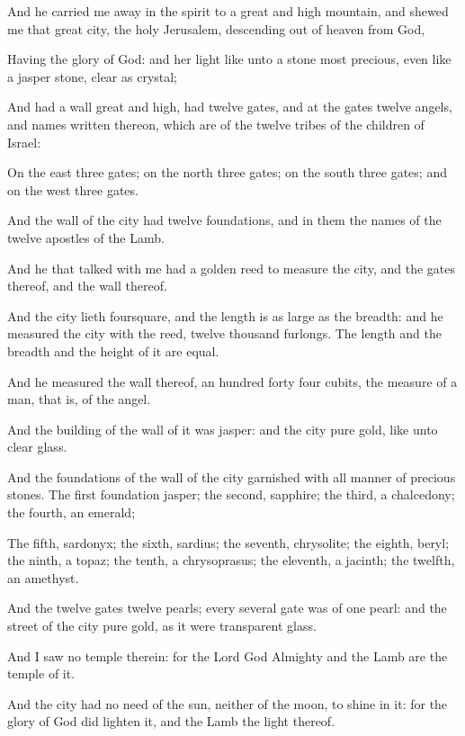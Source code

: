 {And he
carried
me
away
in the
spirit
to a
great
and
high
mountain,
and
shewed
me that
great
city, the
holy
Jerusalem,
descending out
of
heaven
from
God,

Having the
glory of
God:
and
her
light
{} like
unto a
stone most
precious, even
like a
jasper
stone, clear as
crystal;

And
had a
wall
great
and
high,
{}
had
twelve
gates,
and
at the
gates
twelve
angels,
and
names written
thereon,
which
are
{} of the
twelve
tribes of the
children of
Israel:

On the
east
three
gates;
on the
north
three
gates;
on the
south
three
gates; and
on the
west
three
gates.

And the
wall of the
city
had
twelve
foundations,
and
in
them the
names of the
twelve
apostles of the
Lamb.

And
he that
talked
with
me
had a
golden
reed
to
measure the
city,
and the
gates
thereof,
and the
wall
thereof.

And the
city
lieth
foursquare,
and the
length
is as
large
as the
breadth:
and he
measured the
city with the
reed,
twelve
thousand
furlongs. The
length
and the
breadth
and the
height of
it
are
equal.

And he
measured the
wall
thereof, an
hundred
{}
forty
{}
four
cubits,
{} the
measure of a
man,
that
is, of the
angel.

And the
building of the
wall of
it
was
{}
jasper:
and the
city
{}
pure
gold, like
unto
clear
glass.

And the
foundations of the
wall of the
city
{}
garnished with all
manner of
precious
stones. The
first
foundation
{}
jasper; the
second,
sapphire; the
third, a
chalcedony; the
fourth, an
emerald;

The
fifth,
sardonyx; the
sixth,
sardius; the
seventh,
chrysolite; the
eighth,
beryl; the
ninth, a
topaz; the
tenth, a
chrysoprasus; the
eleventh, a
jacinth; the
twelfth, an
amethyst.

And the
twelve
gates
{}
twelve
pearls;
every
several
gate
was
of
one
pearl:
and the
street of the
city
{}
pure
gold, as it
were
transparent
glass.

And I
saw
no
temple
therein:
for the
Lord
God
Almighty
and the
Lamb
are the
temple of
it.

And the
city
had
no
need of the
sun,
neither of the
moon,
to
shine
in
it:
for the
glory of
God did
lighten
it,
and the
Lamb
{} the
light
thereof.

}
